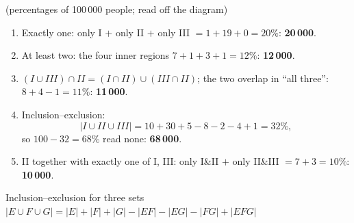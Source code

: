 \begin{slides}
	\small
	\sol (percentages of 100\,000 people; read off the diagram)
	\begin{enumerate}
		\item[(a)] Exactly one: only I $+$ only II $+$ only III
		      $=1+19+0=20\%$: \textbf{20\,000}.
		\item[(b)] At least two: the four inner regions $7+1+3+1=12\%$:
		      \textbf{12\,000}.
		\item[(c)] $(I\cup III)\cap II = (I\cap II)\cup(III\cap II)$; the two
		      overlap in ``all three'': $8+4-1=11\%$: \textbf{11\,000}.
		\item[(d)] Inclusion--exclusion:
		      \[ |I\cup II\cup III| = 10+30+5-8-2-4+1 = 32\%, \]
		      so $100-32=68\%$ read none: \textbf{68\,000}.
		\item[(e)] II together with exactly one of I, III: only I\&II $+$ only
		      II\&III $=7+3=10\%$: \textbf{10\,000}.
	\end{enumerate}
	\begin{block}{Inclusion--exclusion for three sets}
		$|E\cup F\cup G| = |E|+|F|+|G|-|EF|-|EG|-|FG|+|EFG|$
	\end{block}
\end{slides}

